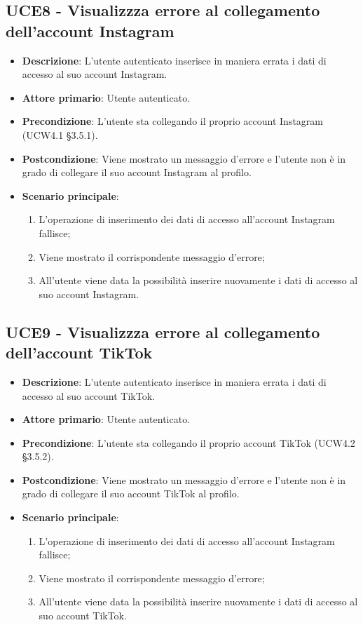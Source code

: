 \subsection{UCE8 - Visualizzza errore al collegamento dell'account Instagram}
\begin{itemize}
\item \textbf{Descrizione}: L'utente autenticato inserisce in maniera errata i dati di accesso al suo account Instagram.
\item \textbf{Attore primario}: Utente autenticato.
\item \textbf{Precondizione}: L'utente sta collegando il proprio account Instagram (UCW4.1 §3.5.1).
\item \textbf{Postcondizione}: Viene mostrato un messaggio d'errore e l'utente non è in grado di collegare il suo account Instagram al profilo.

\item \textbf{Scenario principale}:
\begin{enumerate}
\item L'operazione di inserimento dei dati di accesso all'account Instagram fallisce;
\item Viene mostrato il corrispondente messaggio d'errore;
\item All'utente viene data la possibilità inserire nuovamente i dati di accesso al suo account Instagram.
\end{enumerate}
\end{itemize}

\subsection{UCE9 - Visualizzza errore al collegamento dell'account TikTok}
\begin{itemize}
\item \textbf{Descrizione}: L'utente autenticato inserisce in maniera errata i dati di accesso al suo account TikTok.
\item \textbf{Attore primario}: Utente autenticato.
\item \textbf{Precondizione}: L'utente sta collegando il proprio account TikTok (UCW4.2 §3.5.2).
\item \textbf{Postcondizione}: Viene mostrato un messaggio d'errore e l'utente non è in grado di collegare il suo account TikTok al profilo.

\item \textbf{Scenario principale}:
\begin{enumerate}
\item L'operazione di inserimento dei dati di accesso all'account Instagram fallisce;
\item Viene mostrato il corrispondente messaggio d'errore;
\item All'utente viene data la possibilità inserire nuovamente i dati di accesso al suo account TikTok.
\end{enumerate}
\end{itemize}
